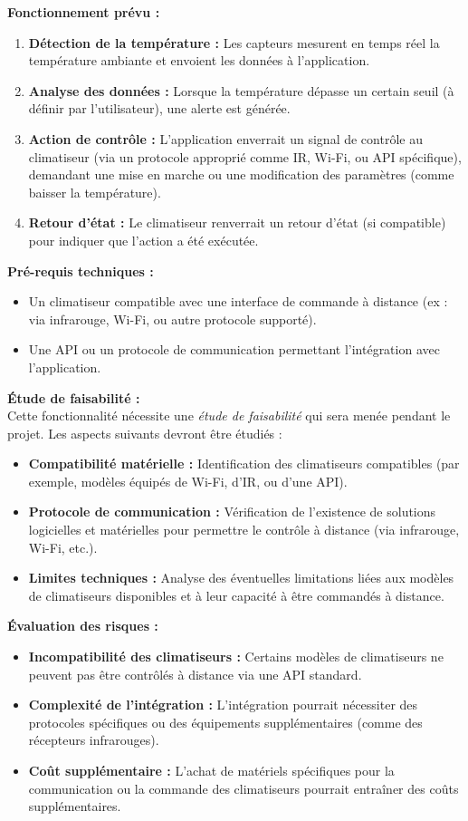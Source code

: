 \documentclass[a4paper,12pt]{article}
\begin{document}
\textbf{Fonctionnement prévu :}
\begin{enumerate}
    \item \textbf{Détection de la température :} Les capteurs mesurent en temps réel la température ambiante et envoient les données à l'application.
    \item \textbf{Analyse des données :} Lorsque la température dépasse un certain seuil (à définir par l'utilisateur), une alerte est générée.
    \item \textbf{Action de contrôle :} L'application enverrait un signal de contrôle au climatiseur (via un protocole approprié comme IR, Wi-Fi, ou API spécifique), demandant une mise en marche ou une modification des paramètres (comme baisser la température).
    \item \textbf{Retour d'état :} Le climatiseur renverrait un retour d'état (si compatible) pour indiquer que l'action a été exécutée.
\end{enumerate}

\textbf{Pré-requis techniques :}
\begin{itemize}
    \item Un climatiseur compatible avec une interface de commande à distance (ex : via infrarouge, Wi-Fi, ou autre protocole supporté).
    \item Une API ou un protocole de communication permettant l'intégration avec l'application.
\end{itemize}

\textbf{Étude de faisabilité :} \\
Cette fonctionnalité nécessite une \textit{étude de faisabilité} qui sera menée pendant le projet. Les aspects suivants devront être étudiés :
\begin{itemize}
    \item \textbf{Compatibilité matérielle :} Identification des climatiseurs compatibles (par exemple, modèles équipés de Wi-Fi, d'IR, ou d'une API).
    \item \textbf{Protocole de communication :} Vérification de l'existence de solutions logicielles et matérielles pour permettre le contrôle à distance (via infrarouge, Wi-Fi, etc.).
    \item \textbf{Limites techniques :} Analyse des éventuelles limitations liées aux modèles de climatiseurs disponibles et à leur capacité à être commandés à distance.
\end{itemize}

\textbf{Évaluation des risques :}
\begin{itemize}
    \item \textbf{Incompatibilité des climatiseurs :} Certains modèles de climatiseurs ne peuvent pas être contrôlés à distance via une API standard.
    \item \textbf{Complexité de l'intégration :} L'intégration pourrait nécessiter des protocoles spécifiques ou des équipements supplémentaires (comme des récepteurs infrarouges).
    \item \textbf{Coût supplémentaire :} L'achat de matériels spécifiques pour la communication ou la commande des climatiseurs pourrait entraîner des coûts supplémentaires.
\end{itemize}
\end{document}
